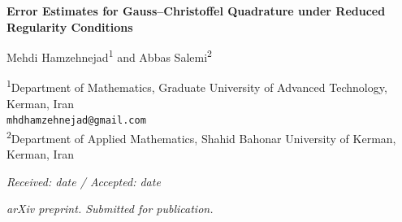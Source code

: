 \documentclass[12pt,a4paper]{article}
\begin{document}
\begin{center}
\LARGE\textbf{Error Estimates for Gauss--Christoffel Quadrature under Reduced Regularity Conditions}
\end{center}

\begin{center}
\large
Mehdi Hamzehnejad\textsuperscript{1} \quad and \quad Abbas Salemi\textsuperscript{2}
\end{center}

\begin{center}
\small
\textsuperscript{1}Department of Mathematics, Graduate University of Advanced Technology, Kerman, Iran \\
\texttt{mhdhamzehnejad@gmail.com} \\
\textsuperscript{2}Department of Applied Mathematics, Shahid Bahonar University of Kerman, Kerman, Iran
\end{center}

\begin{center}
\textit{Received: date / Accepted: date}
\end{center}

\begin{abstract}
\noindent
Gauss--Christoffel quadrature is a fundamental method for numerical integration, and its convergence analysis is closely related to the decay of Chebyshev expansion coefficients. Classical estimates, including those due to Trefethen, are based on weighted bounded variation assumptions involving the singular weight $(1-x^{2})^{-1/2}$, which may be too restrictive for functions with limited regularity at the endpoints.

In this paper, we establish a new error bound for Gauss--Christoffel quadrature under weakened regularity assumptions. The analysis relies on a new identity for higher-order derivatives of Chebyshev polynomials. As a consequence, we obtain an improved decay estimate for Chebyshev coefficients, where the classical weighted condition
\[
V_{r}=\int_{-1}^{1}\frac{|f^{(r+1)}(x)|}{\sqrt{1-x^{2}}}\,dx
\]
is replaced by the weaker condition
\[
U_{r}=\int_{-1}^{1}|f^{(r+1)}(x)|\,dx.
\]

This result leads to a corresponding error estimate for the Gauss--Christoffel quadrature rule, which is less restrictive than previous bounds. The approach is also extended to the Gauss--Gegenbauer case. Numerical experiments are provided to illustrate the theoretical results.

\noindent
\textbf{Keywords:} Gauss-Christoffel quadrature, Chebyshev coefficient, Error estimate, Reduced regularity, Numerical integration

\noindent
\textbf{Mathematics Subject Classification (2020):} 65D32, 65D30, 41A55, 42C10
\end{abstract}
\begin{center}
	\small
	\textit{arXiv preprint. Submitted for publication.}
\end{center}
\end{document}
